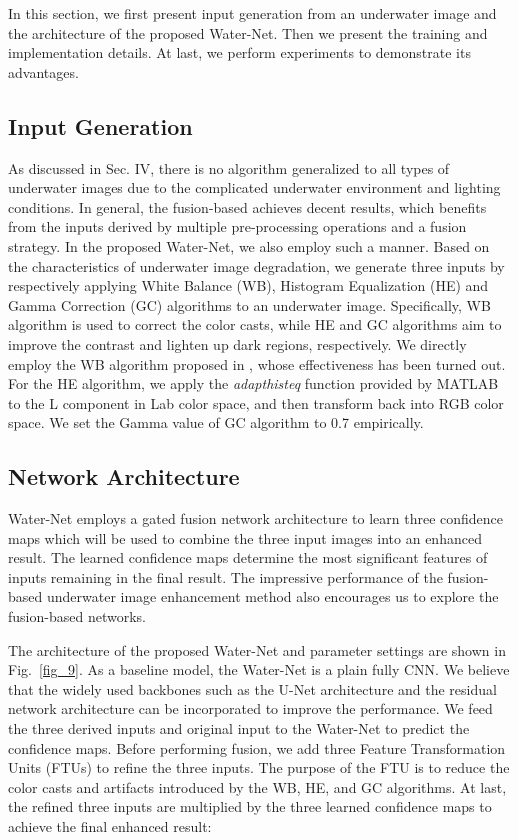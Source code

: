 \documentclass[journal]{IEEEtran}
\begin{document}
In this section, we first present input generation from an underwater image and the architecture of the proposed Water-Net. Then we present the training and implementation details. At last, we perform experiments to demonstrate its advantages.




\subsection{Input Generation}
As discussed in Sec. IV, there is no algorithm generalized to all types of underwater images due to the complicated underwater environment and lighting conditions. In general, the fusion-based \cite{Ancuti2012} achieves decent results, which benefits from the inputs derived by multiple pre-processing operations and a fusion strategy.
In the proposed Water-Net, we also employ such a manner. Based on the characteristics of underwater image degradation, we generate three inputs by respectively applying White Balance (WB), Histogram Equalization (HE) and Gamma Correction (GC) algorithms to an underwater image. Specifically, WB algorithm is used to correct the color casts, while HE and GC algorithms aim to improve the contrast and lighten up dark regions, respectively. We directly employ the WB algorithm proposed in \cite{Ancuti2012}, whose effectiveness has been turned out. For the HE algorithm, we apply the \emph{adapthisteq} function \cite{CLAHE} provided by MATLAB to the L component in Lab color space, and then transform back into RGB color space. We set the Gamma value of GC algorithm to 0.7 empirically.




\subsection{Network Architecture}
Water-Net employs a gated fusion network architecture to learn three confidence maps which will be used to combine the three input images into an enhanced result. The learned confidence maps determine the most significant features of inputs remaining in the final result. The impressive performance of the fusion-based underwater image enhancement method \cite{Ancuti2012} also encourages us to explore the fusion-based networks.



The architecture of the proposed Water-Net and parameter settings are shown in Fig.~\ref{fig_9}. As a baseline model, the Water-Net is a plain fully CNN. We believe that the widely used backbones such as the U-Net architecture \cite{Unet} and the residual network architecture \cite{Residual} can be incorporated to improve the performance. We feed the three derived inputs and original input to the Water-Net to predict the confidence maps. Before performing fusion, we add three Feature Transformation Units (FTUs) to refine the three inputs. The purpose of the FTU is to reduce the color casts and artifacts introduced by the WB, HE, and GC algorithms.  At last, the refined three inputs are multiplied by the three learned confidence maps to achieve the final enhanced result:
\end{document}
